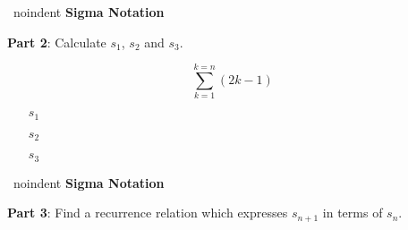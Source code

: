 	\ noindent \textbf{Sigma Notation}
	
	
	\textbf{Part 2}: Calculate $s_1$, $s_2$ and $s_3$.
	
	{
		
		\[  \sum^{k=n}_{k=1} (2k-1) \]
	}
	
	\begin{itemize}
		\item[$s_1$]
		\item[$s_2$]
		\item[$s_3$]
	\end{itemize}
	


	\ noindent \textbf{Sigma Notation}
	
	
	\textbf{Part 3}: Find a recurrence relation which expresses $s_{n+1}$ in terms of $s_n$.
	
	
